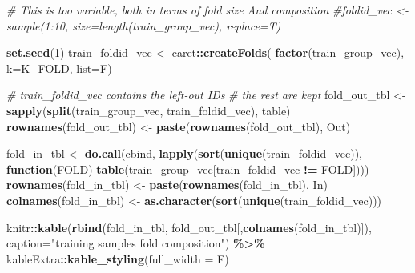\documentclass[
]{book}
\newenvironment{Shaded}{\begin{snugshade}}{\end{snugshade}}
\newcommand{\CommentTok}[1]{\textcolor[rgb]{0.56,0.35,0.01}{\textit{#1}}}
\newcommand{\ControlFlowTok}[1]{\textcolor[rgb]{0.13,0.29,0.53}{\textbf{#1}}}
\newcommand{\DataTypeTok}[1]{\textcolor[rgb]{0.13,0.29,0.53}{#1}}
\newcommand{\DecValTok}[1]{\textcolor[rgb]{0.00,0.00,0.81}{#1}}
\newcommand{\KeywordTok}[1]{\textcolor[rgb]{0.13,0.29,0.53}{\textbf{#1}}}
\newcommand{\NormalTok}[1]{#1}
\newcommand{\OperatorTok}[1]{\textcolor[rgb]{0.81,0.36,0.00}{\textbf{#1}}}
\newcommand{\StringTok}[1]{\textcolor[rgb]{0.31,0.60,0.02}{#1}}
\begin{document}
\begin{Shaded}
\begin{Highlighting}[]
\CommentTok{\# This is too variable, both in terms of fold size And composition}
\CommentTok{\#foldid\_vec <{-} sample(1:10, size=length(train\_group\_vec), replace=T)}

\KeywordTok{set.seed}\NormalTok{(}\DecValTok{1}\NormalTok{)}
\NormalTok{train\_foldid\_vec <{-}}\StringTok{ }\NormalTok{caret}\OperatorTok{::}\KeywordTok{createFolds}\NormalTok{(}
 \KeywordTok{factor}\NormalTok{(train\_group\_vec), }
 \DataTypeTok{k=}\NormalTok{K\_FOLD,}
 \DataTypeTok{list=}\NormalTok{F)}

\CommentTok{\# train\_foldid\_vec contains the left{-}out IDs }
\CommentTok{\# the rest are kept}
\NormalTok{fold\_out\_tbl <{-}}\StringTok{ }\KeywordTok{sapply}\NormalTok{(}\KeywordTok{split}\NormalTok{(train\_group\_vec, train\_foldid\_vec),}
\NormalTok{  table)}
\KeywordTok{rownames}\NormalTok{(fold\_out\_tbl) <{-}}\StringTok{ }\KeywordTok{paste}\NormalTok{(}\KeywordTok{rownames}\NormalTok{(fold\_out\_tbl), }\StringTok{\textquotesingle{}{-} Out\textquotesingle{}}\NormalTok{) }

\NormalTok{fold\_in\_tbl <{-}}\StringTok{ }\KeywordTok{do.call}\NormalTok{(}\StringTok{\textquotesingle{}cbind\textquotesingle{}}\NormalTok{, }\KeywordTok{lapply}\NormalTok{(}\KeywordTok{sort}\NormalTok{(}\KeywordTok{unique}\NormalTok{(train\_foldid\_vec)),}
  \ControlFlowTok{function}\NormalTok{(FOLD) }\KeywordTok{table}\NormalTok{(train\_group\_vec[train\_foldid\_vec }\OperatorTok{!=}\StringTok{ }\NormalTok{FOLD])))}
\KeywordTok{rownames}\NormalTok{(fold\_in\_tbl) <{-}}\StringTok{ }\KeywordTok{paste}\NormalTok{(}\KeywordTok{rownames}\NormalTok{(fold\_in\_tbl), }\StringTok{\textquotesingle{}{-} In\textquotesingle{}}\NormalTok{) }
\KeywordTok{colnames}\NormalTok{(fold\_in\_tbl) <{-}}\StringTok{ }\KeywordTok{as.character}\NormalTok{(}\KeywordTok{sort}\NormalTok{(}\KeywordTok{unique}\NormalTok{(train\_foldid\_vec)))}


\NormalTok{knitr}\OperatorTok{::}\KeywordTok{kable}\NormalTok{(}\KeywordTok{rbind}\NormalTok{(fold\_in\_tbl, fold\_out\_tbl[,}\KeywordTok{colnames}\NormalTok{(fold\_in\_tbl)]),}
  \DataTypeTok{caption=}\StringTok{"training samples fold composition"}\NormalTok{) }\OperatorTok{\%>\%}
\StringTok{   }\NormalTok{kableExtra}\OperatorTok{::}\KeywordTok{kable\_styling}\NormalTok{(}\DataTypeTok{full\_width =}\NormalTok{ F)}
\end{Highlighting}
\end{Shaded}
\end{document}

